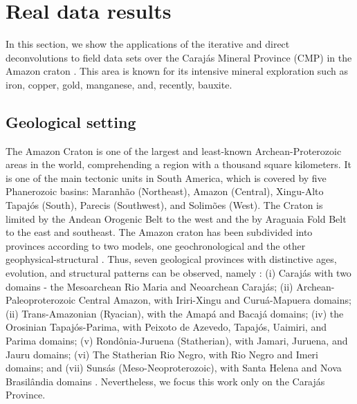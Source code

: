 \section{Real data results}
\label{sec:real_data}

In this section, we show the applications of the iterative and direct deconvolutions to field data sets 
over the Caraj{\'a}s Mineral Province (CMP) in the Amazon craton \citep{moroni-etal2001,villas-santos2001}. 
This area is known for its intensive mineral exploration such as iron, copper, gold, manganese, and, recently, bauxite.

\subsection{Geological setting}

The Amazon Craton is one of the largest and least-known Archean-Proterozoic areas in the world, comprehending a region with a thousand square kilometers. 
It is one of the main tectonic units in South America, which is covered by five Phanerozoic basins: 
Maranh{\~a}o (Northeast), Amazon (Central), Xingu-Alto Tapaj{\'o}s (South), Parecis (Southwest), and Solim{\~o}es (West). 
The Craton is limited by the Andean Orogenic Belt to the west and the by Araguaia Fold Belt to the east and southeast. 
The Amazon craton has been subdivided into provinces according to two models, one geochronological and the other geophysical-structural 
\citep{amaral1974, teixeira-etal1989, tassinari-macambira1999}. Thus, seven geological provinces with distinctive ages, evolution, and structural 
patterns can be observed, namely : (i) Caraj{\'a}s with two domains - the Mesoarchean Rio Maria and Neoarchean Caraj{\'a}s; 
(ii) Archean-Paleoproterozoic Central Amazon, with Iriri-Xingu and Curuá-Mapuera domains; (ii) Trans-Amazonian (Ryacian), with the Amap{\'a} 
and Bacaj{\'a} domains; (iv) the Orosinian Tapaj{\'o}s-Parima, with Peixoto de Azevedo, Tapaj{\'o}s, Uaimiri, and Parima domains; 
(v) Rond{\^o}nia-Juruena (Statherian), with Jamari, Juruena, and Jauru domains; (vi) The Statherian Rio Negro, with Rio Negro and 
Imeri domains; and (vii) Suns{\'a}s (Meso-Neoproterozoic), with Santa Helena and Nova Brasil{\^a}ndia domains \citep{santos-etal2000}. 
Nevertheless, we focus this work only on the Caraj{\'a}s Province. 

